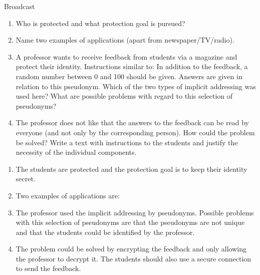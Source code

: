 \documentclass{article}
\begin{document}
\begin{exercise}{Broadcast}
  \begin{enumerate}
    \item Who is protected and what protection goal is pursued?
    \item Name two examples of applications (apart from newspaper/TV/radio).
    \item A professor wants to receive feedback from students via a magazine and protect their identity. Instructions similar to: In addition to the feedback, a random number between 0 and 100 should be given. Answers are given in relation to this pseudonym. Which of the two types of implicit addressing was used here? What are possible problems with regard to this selection of pseudonyms?
    \item The professor does not like that the answers to the feedback can be read by everyone (and not only by the corresponding person). How could the problem be solved? Write a text with instructions to the students and justify the necessity of the individual components.
  \end{enumerate}

  \begin{solution}
    \begin{enumerate}
      \item The students are protected and the protection goal is to keep their identity secret.
      \item Two examples of applications are:
      \item The professor used the implicit addressing by pseudonyms. Possible problems with this selection of pseudonyms are that the pseudonyms are not unique and that the students could be identified by the professor.
      \item The problem could be solved by encrypting the feedback and only allowing the professor to decrypt it. The students should also use a secure connection to send the feedback.
    \end{enumerate}
  \end{solution}
\end{exercise}
\end{document}
